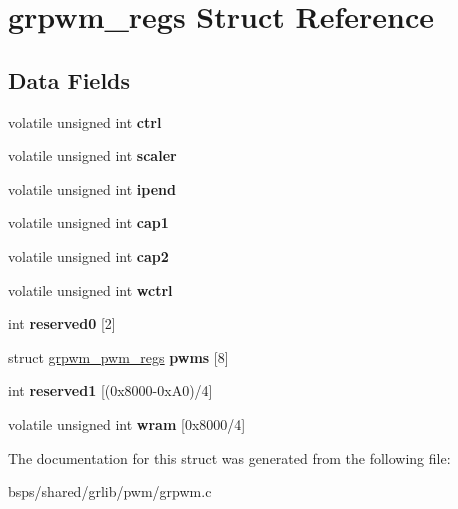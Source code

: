 \hypertarget{structgrpwm__regs}{}\section{grpwm\+\_\+regs Struct Reference}
\label{structgrpwm__regs}
\subsection*{Data Fields}
\begin{DoxyCompactItemize}
\item 
\mbox{\label{structgrpwm__regs_a512e422ec9b07193f57abc3856a44c69}} 
volatile unsigned int {\bfseries ctrl}
\item 
\mbox{\label{structgrpwm__regs_a1b0ad7fd2656786c47db02509c41e962}} 
volatile unsigned int {\bfseries scaler}
\item 
\mbox{\label{structgrpwm__regs_a6b6c3e8c1749dd58b04433d8c26d0437}} 
volatile unsigned int {\bfseries ipend}
\item 
\mbox{\label{structgrpwm__regs_ae2c153254c59f8320b56234e10631b3a}} 
volatile unsigned int {\bfseries cap1}
\item 
\mbox{\label{structgrpwm__regs_a7374446ff71629c22c46eb2389619883}} 
volatile unsigned int {\bfseries cap2}
\item 
\mbox{\label{structgrpwm__regs_a306a703b76721cd514ea849d16012ca9}} 
volatile unsigned int {\bfseries wctrl}
\item 
\mbox{\label{structgrpwm__regs_aa8eb45bcd5d19f9200ae237aa01b21ef}} 
int {\bfseries reserved0} \mbox{[}2\mbox{]}
\item 
\mbox{\label{structgrpwm__regs_a4e42cb2dbf2ed25655b6a447dbd35c6e}} 
struct \mbox{\hyperlink{structgrpwm__pwm__regs}{grpwm\+\_\+pwm\+\_\+regs}} {\bfseries pwms} \mbox{[}8\mbox{]}
\item 
\mbox{\label{structgrpwm__regs_a3f4c2df299b001cf763f7f6b2218db54}} 
int {\bfseries reserved1} \mbox{[}(0x8000-\/0x\+A0)/4\mbox{]}
\item 
\mbox{\label{structgrpwm__regs_a96475935ac9ed7bd0fd7837b695dade1}} 
volatile unsigned int {\bfseries wram} \mbox{[}0x8000/4\mbox{]}
\end{DoxyCompactItemize}


The documentation for this struct was generated from the following file\+:\begin{DoxyCompactItemize}
\item 
bsps/shared/grlib/pwm/grpwm.\+c\end{DoxyCompactItemize}

